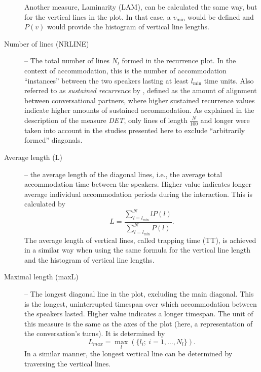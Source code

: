 \begin{description}
	Another measure, Laminarity (LAM), can be calculated the same way, but for the vertical lines in the plot.
	In that case, a $v_{\min}$ would be defined and $P(v)$ would provide the histogram of vertical line lengths.
	
	\item[Number of lines (NRLINE)] -- The total number of lines $N_l$ formed in the recurrence plot.
	In the context of accommodation, this is the number of accommodation \enquote{instances} between the two speakers lasting at least $l_{\min}$ time units.
	Also referred to as \emph{sustained recurrence} by \citet{Borrie2019syncing}, defined as the amount of alignment between conversational partners, where higher sustained recurrence values indicate higher amounts of sustained accommodation.
	As explained in the description of the measure \emph{DET}, only lines of length $\frac{N}{100}$ and longer were taken into account in the studies presented here to exclude \enquote{arbitrarily formed} diagonals.
	
	\item[Average length (L)] -- the average length of the diagonal lines, i.e., the average total accommodation time between the speakers.
	Higher value indicates longer average individual accommodation periods during the interaction.
	This is calculated by
	\begin{equation}
		\label{eq:l}
		L = \frac{\sum_{l=l_{\min}}^N l P(l)}{\sum_{l=l_{\min}}^N P(l)}.
	\end{equation}
	The average length of vertical lines, called trapping time (TT), is achieved in a similar way when using the same formula for the vertical line length and the histogram of vertical line lengths.
	
	\item[Maximal length (maxL)] -- The longest diagonal line in the plot, excluding the main diagonal.	
	This is the longest, uninterrupted timespan over which accommodation between the speakers lasted.
	Higher value indicates a longer timespan.
	The unit of this measure is the same as the axes of the plot (here, a representation of the conversation's turns).
	It is determined by
	\begin{equation}
		\label{eq:maxl}
		L_{max} = \max_{l} (\{l_i; \ i=1, \ldots, N_l\}).
	\end{equation}
	In a similar manner, the longest vertical line can be determined by traversing the vertical lines.
	

\end{description}
